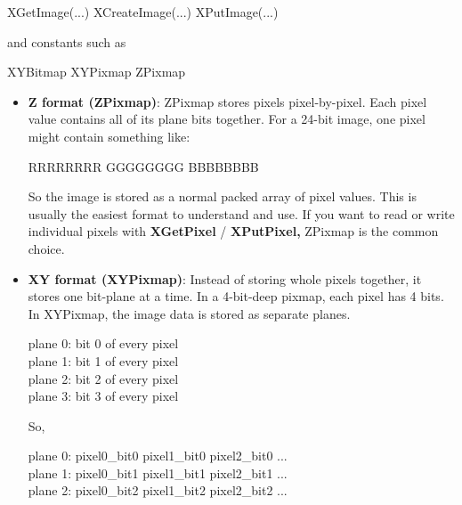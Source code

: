 \documentclass{report}
\begin{document}
\begin{itemize}
            \bigbreak \noindent 
            \begin{cppcode}
            XGetImage(...)
            XCreateImage(...)
            XPutImage(...)
            \end{cppcode}
            \bigbreak \noindent 
            and constants such as
            \bigbreak \noindent 
            \begin{cppcode}
            XYBitmap
            XYPixmap
            ZPixmap
            \end{cppcode}
            \begin{itemize}
                \item \textbf{Z format (ZPixmap)}: ZPixmap stores pixels pixel-by-pixel. Each pixel value contains all of its plane bits together. For a 24-bit image, one pixel might contain something like: 
                    \begin{center}
                     RRRRRRRR \qquad GGGGGGGG \qquad BBBBBBBB                       
                    \end{center}
                    So the image is stored as a normal packed array of pixel values. This is usually the easiest format to understand and use. If you want to read or write individual pixels with \textbf{XGetPixel} / \textbf{XPutPixel,} ZPixmap is the common choice.
                \item \textbf{XY format (XYPixmap)}: Instead of storing whole pixels together, it stores one bit-plane at a time. In a 4-bit-deep pixmap, each pixel has 4 bits. In XYPixmap, the image data is stored as separate planes.
                    \begin{center}
                        plane 0: bit 0 of every pixel \\
                        plane 1: bit 1 of every pixel \\
                        plane 2: bit 2 of every pixel \\
                        plane 3: bit 3 of every pixel
                    \end{center}
                    So,
                    \begin{center}
                        plane 0: \qquad pixel0\_bit0 pixel1\_bit0 pixel2\_bit0 ... \\
                        plane 1: \qquad pixel0\_bit1 pixel1\_bit1 pixel2\_bit1 ...\\
                        plane 2: \qquad pixel0\_bit2 pixel1\_bit2 pixel2\_bit2 ...\\

\end{center}
\end{itemize}
\end{itemize}
\end{document}

